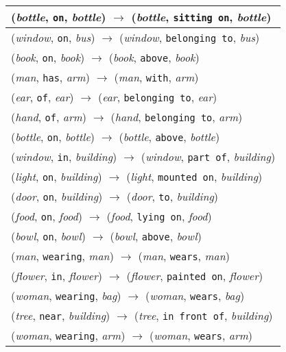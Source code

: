 \documentclass[runningheads]{llncs}
\begin{document}
{\begin{longtable}{ l }
(\textit{bottle}, \texttt{on}, \textit{bottle}) $\rightarrow$ (\textit{bottle}, \texttt{sitting on}, \textit{bottle}) \\ \hline
(\textit{window}, \texttt{on}, \textit{bus}) $\rightarrow$ (\textit{window}, \texttt{belonging to}, \textit{bus}) \\ \hline
(\textit{book}, \texttt{on}, \textit{book}) $\rightarrow$ (\textit{book}, \texttt{above}, \textit{book}) \\ \hline
(\textit{man}, \texttt{has}, \textit{arm}) $\rightarrow$ (\textit{man}, \texttt{with}, \textit{arm}) \\ \hline
(\textit{ear}, \texttt{of}, \textit{ear}) $\rightarrow$ (\textit{ear}, \texttt{belonging to}, \textit{ear}) \\ \hline
(\textit{hand}, \texttt{of}, \textit{arm}) $\rightarrow$ (\textit{hand}, \texttt{belonging to}, \textit{arm}) \\ \hline
(\textit{bottle}, \texttt{on}, \textit{bottle}) $\rightarrow$ (\textit{bottle}, \texttt{above}, \textit{bottle}) \\ \hline
(\textit{window}, \texttt{in}, \textit{building}) $\rightarrow$ (\textit{window}, \texttt{part of}, \textit{building}) \\ \hline
(\textit{light}, \texttt{on}, \textit{building}) $\rightarrow$ (\textit{light}, \texttt{mounted on}, \textit{building}) \\ \hline
(\textit{door}, \texttt{on}, \textit{building}) $\rightarrow$ (\textit{door}, \texttt{to}, \textit{building}) \\ \hline
(\textit{food}, \texttt{on}, \textit{food}) $\rightarrow$ (\textit{food}, \texttt{lying on}, \textit{food}) \\ \hline
(\textit{bowl}, \texttt{on}, \textit{bowl}) $\rightarrow$ (\textit{bowl}, \texttt{above}, \textit{bowl}) \\ \hline
(\textit{man}, \texttt{wearing}, \textit{man}) $\rightarrow$ (\textit{man}, \texttt{wears}, \textit{man}) \\ \hline
(\textit{flower}, \texttt{in}, \textit{flower}) $\rightarrow$ (\textit{flower}, \texttt{painted on}, \textit{flower}) \\ \hline
(\textit{woman}, \texttt{wearing}, \textit{bag}) $\rightarrow$ (\textit{woman}, \texttt{wears}, \textit{bag}) \\ \hline
(\textit{tree}, \texttt{near}, \textit{building}) $\rightarrow$ (\textit{tree}, \texttt{in front of}, \textit{building}) \\ \hline
(\textit{woman}, \texttt{wearing}, \textit{arm}) $\rightarrow$ (\textit{woman}, \texttt{wears}, \textit{arm}) \\ \hline

\end{longtable}}
\end{document}
